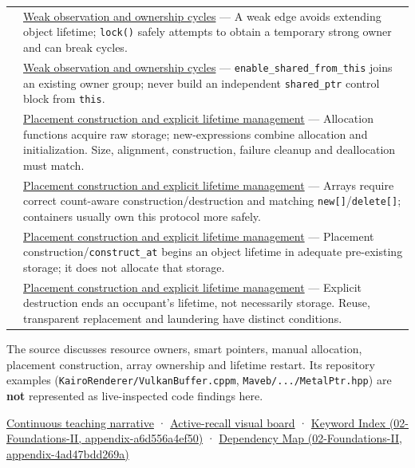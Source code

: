 {\begin{longtable}[]{@{}
  >{\raggedright\arraybackslash}p{}
  >{\raggedright\arraybackslash}p{}@{}}
155 & \hyperref[appendix-b9548675eb2b]{Weak observation and ownership cycles} --- A weak edge avoids extending object lifetime; \texttt{lock()} safely attempts to obtain a temporary strong owner and can break cycles. \\
156 & \hyperref[appendix-b9548675eb2b]{Weak observation and ownership cycles} --- \texttt{enable\_shared\_from\_this} joins an existing owner group; never build an independent \texttt{shared\_ptr} control block from \texttt{this}. \\
157 & \hyperref[appendix-f56c3e43fd4e]{Placement construction and explicit lifetime management} --- Allocation functions acquire raw storage; new-expressions combine allocation and initialization. Size, alignment, construction, failure cleanup and deallocation must match. \\
158 & \hyperref[appendix-f56c3e43fd4e]{Placement construction and explicit lifetime management} --- Arrays require correct count-aware construction/destruction and matching \texttt{new{[}{]}}/\texttt{delete{[}{]}}; containers usually own this protocol more safely. \\
159 & \hyperref[appendix-f56c3e43fd4e]{Placement construction and explicit lifetime management} --- Placement construction/\texttt{construct\_at} begins an object lifetime in adequate pre-existing storage; it does not allocate that storage. \\
160 & \hyperref[appendix-f56c3e43fd4e]{Placement construction and explicit lifetime management} --- Explicit destruction ends an occupant's lifetime, not necessarily storage. Reuse, transparent replacement and laundering have distinct conditions. \\
\end{longtable}
}

The source discusses resource owners, smart pointers, manual allocation, placement construction, array ownership and lifetime restart. Its repository examples (\texttt{KairoRenderer/VulkanBuffer.cppm}, \texttt{Maveb/.../MetalPtr.hpp}) are \textbf{not} represented as live-inspected code findings here.

\hyperref[01-foundations-i-ch004-from-a-live-object-to-responsible-resource-ownership]{Continuous teaching narrative} · \hyperref[appendix-960160274237]{Active-recall visual board} · \href{../02-Foundations-II/main.pdf\#nameddest=appendix-a6d556a4ef50}{Keyword Index (02-Foundations-II, appendix-a6d556a4ef50)} · \href{../02-Foundations-II/main.pdf\#nameddest=appendix-4ad47bdd269a}{Dependency Map (02-Foundations-II, appendix-4ad47bdd269a)}

